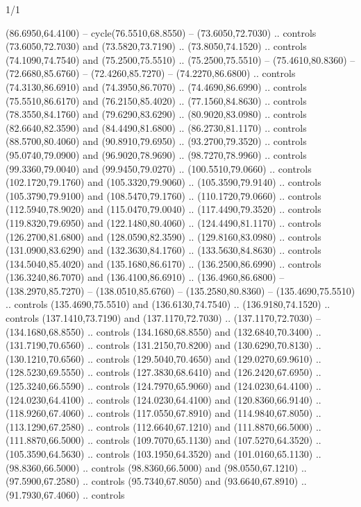 \begin{flagdescription}{1/1}
\begin{scope}[xshift=0.75\flaglength]
\begin{scope}[scale=0.00209\flagwidth,yshift=134.4mm,xshift=-29.7mm]
\begin{scope}[y=0.80pt, x=0.80pt, yscale=-1, xscale=1, inner sep=0pt, outer sep=0pt,line width=0.0015\flagwidth]
  (86.6950,64.4100) -- cycle(76.5510,68.8550) -- (73.6050,72.7030) .. controls
  (73.6050,72.7030) and (73.5820,73.7190) .. (73.8050,74.1520) .. controls
  (74.1090,74.7540) and (75.2500,75.5510) .. (75.2500,75.5510) --
  (75.4610,80.8360) -- (72.6680,85.6760) -- (72.4260,85.7270) --
  (74.2270,86.6800) .. controls (74.3130,86.6910) and (74.3950,86.7070) ..
  (74.4690,86.6990) .. controls (75.5510,86.6170) and (76.2150,85.4020) ..
  (77.1560,84.8630) .. controls (78.3550,84.1760) and (79.6290,83.6290) ..
  (80.9020,83.0980) .. controls (82.6640,82.3590) and (84.4490,81.6800) ..
  (86.2730,81.1170) .. controls (88.5700,80.4060) and (90.8910,79.6950) ..
  (93.2700,79.3520) .. controls (95.0740,79.0900) and (96.9020,78.9690) ..
  (98.7270,78.9960) .. controls (99.3360,79.0040) and (99.9450,79.0270) ..
  (100.5510,79.0660) .. controls (102.1720,79.1760) and (105.3320,79.9060) ..
  (105.3590,79.9140) .. controls (105.3790,79.9100) and (108.5470,79.1760) ..
  (110.1720,79.0660) .. controls (112.5940,78.9020) and (115.0470,79.0040) ..
  (117.4490,79.3520) .. controls (119.8320,79.6950) and (122.1480,80.4060) ..
  (124.4490,81.1170) .. controls (126.2700,81.6800) and (128.0590,82.3590) ..
  (129.8160,83.0980) .. controls (131.0900,83.6290) and (132.3630,84.1760) ..
  (133.5630,84.8630) .. controls (134.5040,85.4020) and (135.1680,86.6170) ..
  (136.2500,86.6990) .. controls (136.3240,86.7070) and (136.4100,86.6910) ..
  (136.4960,86.6800) -- (138.2970,85.7270) -- (138.0510,85.6760) --
  (135.2580,80.8360) -- (135.4690,75.5510) .. controls (135.4690,75.5510) and
  (136.6130,74.7540) .. (136.9180,74.1520) .. controls (137.1410,73.7190) and
  (137.1170,72.7030) .. (137.1170,72.7030) -- (134.1680,68.8550) .. controls
  (134.1680,68.8550) and (132.6840,70.3400) .. (131.7190,70.6560) .. controls
  (131.2150,70.8200) and (130.6290,70.8130) .. (130.1210,70.6560) .. controls
  (129.5040,70.4650) and (129.0270,69.9610) .. (128.5230,69.5550) .. controls
  (127.3830,68.6410) and (126.2420,67.6950) .. (125.3240,66.5590) .. controls
  (124.7970,65.9060) and (124.0230,64.4100) .. (124.0230,64.4100) .. controls
  (124.0230,64.4100) and (120.8360,66.9140) .. (118.9260,67.4060) .. controls
  (117.0550,67.8910) and (114.9840,67.8050) .. (113.1290,67.2580) .. controls
  (112.6640,67.1210) and (111.8870,66.5000) .. (111.8870,66.5000) .. controls
  (109.7070,65.1130) and (107.5270,64.3520) .. (105.3590,64.5630) .. controls
  (103.1950,64.3520) and (101.0160,65.1130) .. (98.8360,66.5000) .. controls
  (98.8360,66.5000) and (98.0550,67.1210) .. (97.5900,67.2580) .. controls
  (95.7340,67.8050) and (93.6640,67.8910) .. (91.7930,67.4060) .. controls

\end{scope}
\end{scope}
\end{scope}
\end{flagdescription}
